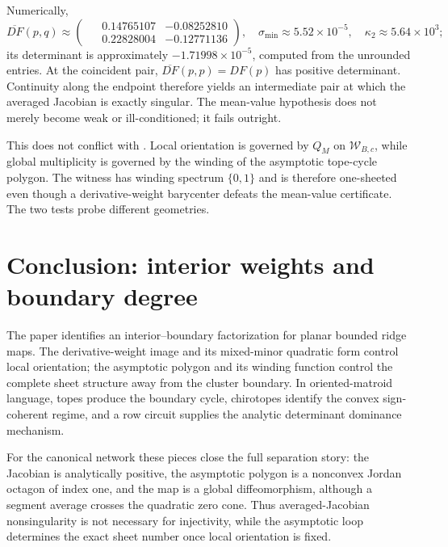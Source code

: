 \documentclass[11pt,twoside,leqno]{article}
\theoremstyle{plain}
\theoremstyle{definition}
\theoremstyle{remark}
\newcommand{\Wder}{\mathcal{W}_{B,c}}
\begin{document}
Numerically,
\[
\overline{DF}(p,q)\approx
\begin{pmatrix} \phantom{-}0.14765107 & -0.08252810\\
                \phantom{-}0.22828004 & -0.12771136 \end{pmatrix},
\quad \sigma_{\min}\approx 5.52\times10^{-5},\quad
\kappa_2\approx 5.64\times10^{3};
\]
its determinant is approximately $-1.71998\times10^{-5}$, computed from the unrounded entries.  At the coincident pair, $\overline{DF}(p,p)=DF(p)$ has positive determinant.  Continuity along the endpoint therefore yields an intermediate pair at which the averaged Jacobian is exactly singular.  The mean-value hypothesis does not merely become weak or ill-conditioned; it fails outright.

This does not conflict with .  Local orientation is governed by $Q_M$ on $\Wder$, while global multiplicity is governed by the winding of the asymptotic tope-cycle polygon.  The witness has winding spectrum $\{0,1\}$ and is therefore one-sheeted even though a derivative-weight barycenter defeats the mean-value certificate.  The two tests probe different geometries.

\section{Conclusion: interior weights and boundary degree}\label{sec:conclusion}

The paper identifies an interior--boundary factorization for planar bounded ridge maps.  The derivative-weight image and its mixed-minor quadratic form control local orientation; the asymptotic polygon and its winding function control the complete sheet structure away from the cluster boundary.  In oriented-matroid language, topes produce the boundary cycle, chirotopes identify the convex sign-coherent regime, and a row circuit supplies the analytic determinant dominance mechanism.

For the canonical network these pieces close the full separation story: the Jacobian is analytically positive, the asymptotic polygon is a nonconvex Jordan octagon of index one, and the map is a global diffeomorphism, although a segment average crosses the quadratic zero cone. Thus averaged-Jacobian nonsingularity is not necessary for injectivity, while the asymptotic loop determines the exact sheet number once local orientation is fixed.

\end{document}
